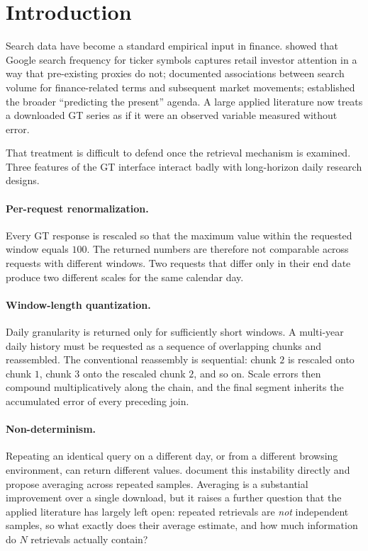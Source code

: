 \documentclass[12pt,a4paper,oneside]{article}
\begin{document}
\tableofcontents
\newpage

\section{Introduction}

Search data have become a standard empirical input in finance. \citet{DaEG2011,DaEG2015}
showed that Google search frequency for ticker symbols captures retail investor
attention in a way that pre-existing proxies do not; \citet{PreisMS2013}
documented associations between search volume for finance-related terms and
subsequent market movements; \citet{ChoiVarian2012} established the broader
``predicting the present'' agenda. A large applied literature now treats a
downloaded GT series as if it were an observed variable measured without error.

That treatment is difficult to defend once the retrieval mechanism is examined.
Three features of the GT interface interact badly with long-horizon daily
research designs.

\paragraph{Per-request renormalization.} Every GT response is rescaled so that
the maximum value within the requested window equals $100$. The returned numbers
are therefore not comparable across requests with different windows. Two
requests that differ only in their end date produce two different scales for the
same calendar day.

\paragraph{Window-length quantization.} Daily granularity is returned only for
sufficiently short windows. A multi-year daily history must be requested as a
sequence of overlapping chunks and reassembled. The conventional reassembly is
sequential: chunk $2$ is rescaled onto chunk $1$, chunk $3$ onto the rescaled
chunk $2$, and so on. Scale errors then compound multiplicatively along the
chain, and the final segment inherits the accumulated error of every preceding
join.

\paragraph{Non-determinism.} Repeating an identical query on a different day, or
from a different browsing environment, can return different values.
\citet{EichenauerIMS2022} document this instability directly and propose
averaging across repeated samples. Averaging is a substantial improvement over a
single download, but it raises a further question that the applied literature has
largely left open: repeated retrievals are \emph{not} independent samples, so
what exactly does their average estimate, and how much information do $N$
retrievals actually contain?
\end{document}
